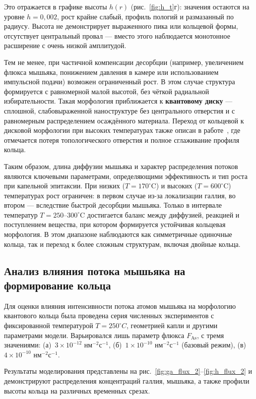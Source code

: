 \documentclass[14pt,oneside]{extarticle}
\begin{document}
Это отражается в графике высоты $h(r)$ (рис.~\ref{fig:h_t}г): значения остаются на уровне $h = 0{,}002$, рост крайне слабый, профиль пологий и размазанный по радиусу. Высота не демонстрирует выраженного пика или кольцевой формы, отсутствует центральный провал — вместо этого наблюдается монотонное расширение с очень низкой амплитудой.

Тем не менее, при частичной компенсации десорбции (например, увеличением флюкса мышьяка, понижением давления в камере или использованием импульсной подачи) возможен ограниченный рост. В этом случае структура формируется с равномерной малой высотой, без чёткой радиальной избирательности. Такая морфология приближается к \textbf{квантовому диску} — сплошной, слабовыраженной наноструктуре без центрального отверстия и с равномерным распределением осаждённого материала. Переход от кольцевой к дисковой морфологии при высоких температурах также описан в работе~\cite{fan2023evaporation}, где отмечается потеря топологического отверстия и полное сглаживание профиля кольца.

Таким образом, длина диффузии мышьяка и характер распределения потоков являются ключевыми параметрами, определяющими эффективность и тип роста при капельной эпитаксии. При низких ($T = 170^\circ$C) и высоких ($T = 600^\circ$C) температурах рост ограничен: в первом случае из-за локализации галлия, во втором — вследствие быстрой десорбции мышьяка. Только в интервале температур $T = 250$–$300^\circ$C достигается баланс между диффузией, реакцией и поступлением вещества, при котором формируется устойчивая кольцевая морфология. В этом диапазоне наблюдаются как симметричные одиночные кольца, так и переход к более сложным структурам, включая двойные кольца.

\subsection{Анализ влияния потока мышьяка на формирование кольца}

Для оценки влияния интенсивности потока атомов мышьяка на морфологию квантового кольца была проведена серия численных экспериментов с фиксированной температурой \(T = 250^\circ C\), геометрией капли и другими параметрами модели. Варьировался лишь параметр флюкса \( F_{\text{As}} \), с тремя значениями: (а)~\(3 \times 10^{-12}\) нм$^{-2}$с$^{-1}$, (б)~\(1 \times 10^{-10}\) нм$^{-2}$с$^{-1}$ (базовый режим), (в)~\(4 \times 10^{-10}\) нм$^{-2}$с$^{-1}$.

Результаты моделирования представлены на рис.~\ref{fig:ga_flux_2}–\ref{fig:h_flux_2} и демонстрируют распределения концентраций галлия, мышьяка, а также профили высоты кольца на различных временных срезах.
\end{document}
